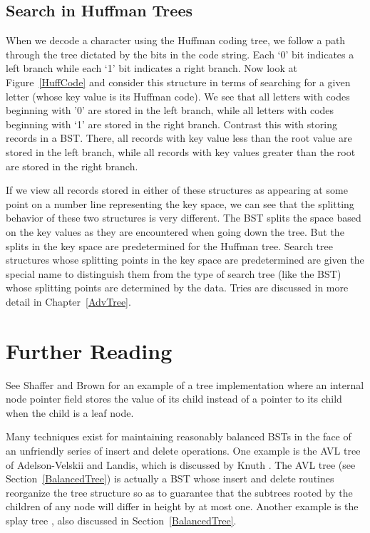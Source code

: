 \subsection{Search in Huffman Trees}

When we decode a character using the Huffman coding tree, we follow a
path through the tree dictated by the bits in the code string.
Each `0' bit indicates a left branch while each `1' bit indicates a
right branch.
Now look at Figure~\ref{HuffCode} and consider this structure in terms
of searching for a given letter (whose key value is its Huffman code).
We see that all letters with codes beginning with '0' are stored in
the left branch, while all letters with codes beginning with `1' are
stored in the right branch.
Contrast this with storing records in a BST.
There, all records with key value less than the root value are stored
in the left branch, while all records with key values greater than the
root are stored in the right branch.

If we view all records stored in either of these structures as
appearing at some point on a number line representing the key space,
we can see that the splitting behavior of these two structures is very
different.
The BST splits the space based on the key values as they are
encountered when going down the tree.
But the splits in the key space are predetermined for the Huffman
tree.
Search tree structures whose splitting points in the key space are
predetermined are given the special name  to
distinguish them from the type of search tree (like the BST) whose
splitting points are determined by the data.
Tries are discussed in more detail in Chapter~\ref{AdvTree}.

\section{Further Reading}

See Shaffer and Brown \cite{PBTree}
for an example of a tree implementation where an internal node
pointer field stores the value of its child instead of a pointer to
its child when the child is a leaf node.

Many techniques exist for maintaining reasonably balanced BSTs in the
face of an unfriendly series of insert and delete
operations.
One example is the AVL tree of Adelson-Velskii and Landis, which is
discussed by Knuth \cite{KnuthV3}.
The AVL tree (see Section~\ref{BalancedTree})
is actually a BST whose insert and delete routines reorganize the tree
structure so as to guarantee that the subtrees rooted by the children
of any node will differ in height by at most one.
Another example is the splay tree \cite{SplayRef}, also discussed in
Section~\ref{BalancedTree}.

